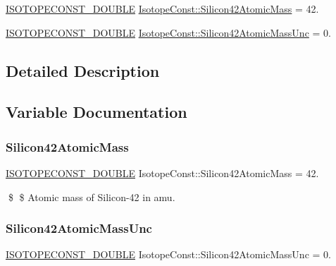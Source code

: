 \begin{DoxyCompactItemize}
\item 
\mbox{\hyperlink{group___isotope_const-_macros_ga8f45a7272ce02c0b4c65c44636ed719a}{I\+S\+O\+T\+O\+P\+E\+C\+O\+N\+S\+T\+\_\+\+D\+O\+U\+B\+LE}} \mbox{\hyperlink{group___isotope_const-_silicon-_si42_gaa2630f689b8714abdeba00ab927bff5d}{Isotope\+Const\+::\+Silicon42\+Atomic\+Mass}} = 42.
\item 
\mbox{\hyperlink{group___isotope_const-_macros_ga8f45a7272ce02c0b4c65c44636ed719a}{I\+S\+O\+T\+O\+P\+E\+C\+O\+N\+S\+T\+\_\+\+D\+O\+U\+B\+LE}} \mbox{\hyperlink{group___isotope_const-_silicon-_si42_gad697670766168e8b2da85b9b847e78cd}{Isotope\+Const\+::\+Silicon42\+Atomic\+Mass\+Unc}} = 0.
\end{DoxyCompactItemize}


\subsection{Detailed Description}


\subsection{Variable Documentation}
\mbox{\label{group___isotope_const-_silicon-_si42_gaa2630f689b8714abdeba00ab927bff5d}} 
\subsubsection{\texorpdfstring{Silicon42\+Atomic\+Mass}{Silicon42AtomicMass}}
{\footnotesize\ttfamily \mbox{\hyperlink{group___isotope_const-_macros_ga8f45a7272ce02c0b4c65c44636ed719a}{I\+S\+O\+T\+O\+P\+E\+C\+O\+N\+S\+T\+\_\+\+D\+O\+U\+B\+LE}} Isotope\+Const\+::\+Silicon42\+Atomic\+Mass = 42.}

\$ \$ Atomic mass of Silicon-\/42 in amu. \mbox{\label{group___isotope_const-_silicon-_si42_gad697670766168e8b2da85b9b847e78cd}} 
\subsubsection{\texorpdfstring{Silicon42\+Atomic\+Mass\+Unc}{Silicon42AtomicMassUnc}}
{\footnotesize\ttfamily \mbox{\hyperlink{group___isotope_const-_macros_ga8f45a7272ce02c0b4c65c44636ed719a}{I\+S\+O\+T\+O\+P\+E\+C\+O\+N\+S\+T\+\_\+\+D\+O\+U\+B\+LE}} Isotope\+Const\+::\+Silicon42\+Atomic\+Mass\+Unc = 0.}

